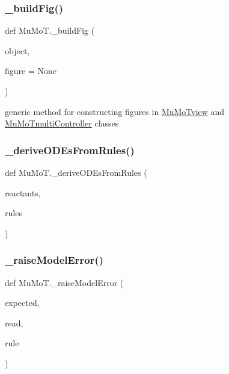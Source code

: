 \subsubsection{\texorpdfstring{\+\_\+build\+Fig()}{\_buildFig()}}
{\footnotesize\ttfamily def Mu\+Mo\+T.\+\_\+build\+Fig (\begin{DoxyParamCaption}\item[{}]{object,  }\item[{}]{figure = {\ttfamily None} }\end{DoxyParamCaption})\hspace{0.3cm}{\ttfamily [private]}}



generic method for constructing figures in \hyperlink{class_mu_mo_t_1_1_mu_mo_tview}{Mu\+Mo\+Tview} and \hyperlink{class_mu_mo_t_1_1_mu_mo_tmulti_controller}{Mu\+Mo\+Tmulti\+Controller} classes 

\mbox{\label{namespace_mu_mo_t_a276566fb102dd4e4bf32a9ba4fb8a09b}} 
\subsubsection{\texorpdfstring{\+\_\+derive\+O\+D\+Es\+From\+Rules()}{\_deriveODEsFromRules()}}
{\footnotesize\ttfamily def Mu\+Mo\+T.\+\_\+derive\+O\+D\+Es\+From\+Rules (\begin{DoxyParamCaption}\item[{}]{reactants,  }\item[{}]{rules }\end{DoxyParamCaption})\hspace{0.3cm}{\ttfamily [private]}}

\mbox{\label{namespace_mu_mo_t_a07dd350ff74bc1abafd7f44f972089a2}} 
\subsubsection{\texorpdfstring{\+\_\+raise\+Model\+Error()}{\_raiseModelError()}}
{\footnotesize\ttfamily def Mu\+Mo\+T.\+\_\+raise\+Model\+Error (\begin{DoxyParamCaption}\item[{}]{expected,  }\item[{}]{read,  }\item[{}]{rule }\end{DoxyParamCaption})\hspace{0.3cm}{\ttfamily [private]}}

